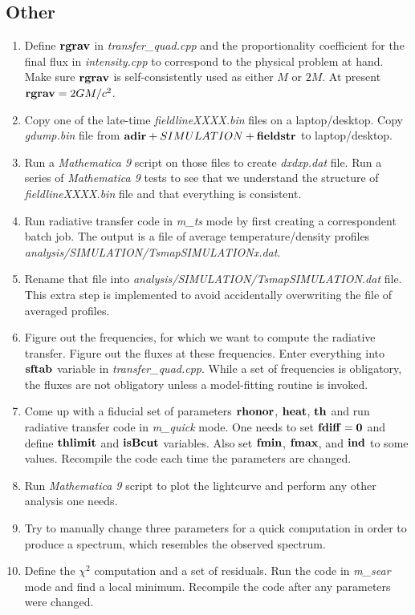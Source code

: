 \documentclass{emulateapj}
\newcommand{\mat}{\textit{Mathematica 9 }}
\begin{document}
\subsection{Other}
\begin{enumerate}
\item{Define ${\bf rgrav}$ in \textit{transfer\_quad.cpp} and the proportionality coefficient for the final flux in \textit{intensity.cpp} to correspond to the physical problem at hand.
Make sure ${\bf rgrav}$ is self-consistently used as either $M$ or $2M$. At present ${\bf rgrav}=2GM/c^2$.}
\item{Copy one of the late-time \textit{fieldlineXXXX.bin} files on a laptop/desktop. Copy \textit{gdump.bin} file from ${\bf adir}+ SIMULATION +{\bf fieldstr}$ to laptop/desktop.}
\item{Run a \mat script on those files to create \textit{dxdxp.dat} file. Run a series of \mat tests to see that we understand the structure of \textit{fieldlineXXXX.bin} file and
that everything is consistent.}
\item{Run radiative transfer code in \textit{m\_ts} mode by first creating a correspondent batch job. The output is a file of average temperature/density profiles
\textit{analysis/SIMULATION/TsmapSIMULATIONx.dat}.}
\item{Rename that file into \textit{analysis/SIMULATION/TsmapSIMULATION.dat} file. This extra step is implemented to avoid accidentally overwriting the file of averaged profiles.}
\item{Figure out the frequencies, for which we want to compute the radiative transfer. Figure out the fluxes at these frequencies. Enter everything into ${\bf sftab}$ variable in
\textit{transfer\_quad.cpp}. While a set of frequencies is obligatory, the fluxes are not obligatory unless a model-fitting routine is invoked.}
\item{Come up with a fiducial set of parameters $\bf rhonor$, $\bf heat$, $\bf th$ and run radiative transfer code in \textit{m\_quick} mode. One needs to set $\bf fdiff=0$ and
define $\bf thlimit$ and $\bf isBcut$ variables. Also set ${\bf fmin}$, ${\bf fmax}$, and ${\bf ind}$ to some values. Recompile the code each time the parameters are changed.}
\item{Run \mat script to plot the lightcurve and perform any other analysis one needs.}
\item{Try to manually change three parameters for a quick computation in order to produce a spectrum, which resembles the observed spectrum.}
\item{Define the $\chi^2$ computation and a set of residuals.  Run the code in \textit{m\_sear} mode and find a local minimum. Recompile the code after any parameters were changed.
}
\end{enumerate}
\end{document}
